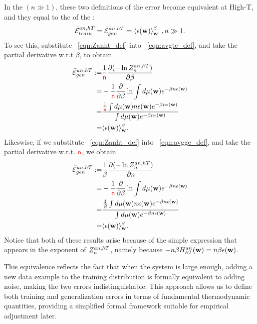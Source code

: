 In the \ThermodynamicLimit $(n \gg 1)$, these two definitions of the error become equivalent at High-T,
and they equal to the \ThermalAverage of the \EffectivePotential:
\begin{align}
  \bar{\mathcal{E}}_{train}^{an, hT} = \bar{\mathcal{E}}_{gen}^{an, hT} = \left\langle \epsilon({\mathbf{w}}) \right\rangle_{\mathbf w}^{\beta}\;,n\gg 1 .
\end{align}
To see this, substitute \EQN~\ref{eqn:Zanht_def} into \EQN~\ref{eqn:avgte_def}, and take the partial derivative w.r.t $\beta$, to obtain
\begin{align}
  \label{eqn:avgge_anhT}
  \bar{\mathcal{E}}_{gen}^{an, hT} :=&\frac{1}{{\color{red}\sf{n}}}\dfrac{\partial (-\ln Z^{an,hT}_{n})}{\partial \beta}  \\ \nonumber
   =& - \dfrac{1}{{\color{red}\sf{n}}}\dfrac{\partial}{\partial \beta}\ln\int d\mu({\mathbf{w}})e^{-\beta n\epsilon({\mathbf{w}})} \\  \nonumber
   =&  \dfrac{
              \tfrac{1}{{\color{red}\sf{n}}}  \int  d\mu({\mathbf{w}}) n\epsilon({\mathbf{w}}) e^{-\beta n\epsilon({\mathbf{w}})} 
             }{
              \int  d\mu({\mathbf{w}}) e^{-\beta n\epsilon({\mathbf{w}})} 
   } \\ \nonumber
   =&\langle\epsilon({\mathbf{w}}) \rangle_{{\mathbf{w}}}^{\beta} .
  \end{align}
Likeswise, if we substitute \EQN~\ref{eqn:Zanht_def} into \EQN~\ref{eqn:avgge_def}, and take the partial derivative w.r.t. ${\color{red}\sf{n}}$, we obtain
\begin{align}
  \label{eqn:avgte_anhT}
    \bar{\mathcal{E}}_{gen}^{an, hT}  :=& \frac{1}{\beta}\dfrac{\partial (-\ln Z^{an,hT}_{n})}{\partial n} \\ \nonumber
    =& - \dfrac{1}{{\color{red}\sf{n}}}\dfrac{\partial}{\partial \beta}\ln\int d\mu({\mathbf{w}})e^{-\beta n\epsilon({\mathbf{w}})} \\  \nonumber
   =&  \dfrac{
              \tfrac{1}{\beta}  \int  d\mu({\mathbf{w}}) n\epsilon({\mathbf{w}}) e^{-\beta n\epsilon({\mathbf{w}})} 
             }{
     \int  d\mu({\mathbf{w}}) e^{-\beta n\epsilon({\mathbf{w}})} 
   } \\ \nonumber
   =&\langle\epsilon({\mathbf{w}}) \rangle_{{\mathbf{w}}}^{\beta} .
\end{align}
Notice that both of these results arise because of the simple expression that appears in the exponent of $Z^{an,hT}_{n}$, namely because $-n\beta H^{an}_{hT}({\mathbf{w}})=n\beta\epsilon({\mathbf{w}})$.


This equivalence reflects the fact that when the system is large enough, adding a new data example to the
training distribution is formally equivalent to adding noise, making the two errors indistinguishable.
This approach allows us to define both training and generalization errors in terms of fundamental thermodynamic quantities,
providing a simplified formal framework suitable for empirical adjustment later.

